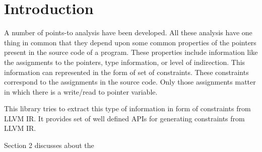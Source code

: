\chapter{Introduction}

A number of points-to analysis have been developed. All these analysis have one 
thing in common that they depend upon some common properties of the pointers 
present in the source code of a program. These properties include information 
like the assignments to the pointers, type information, or level of indirection.
This information can represented in the form of set of constraints. These 
constraints correspond to the assignments in the source code. Only those 
assignments matter in which there is a write/read to pointer variable.

This library tries to extract this type of information in form of constraints 
from LLVM IR. It provides set of well defined APIs for generating constraints 
from LLVM IR.

Section 2 discusses about the 
